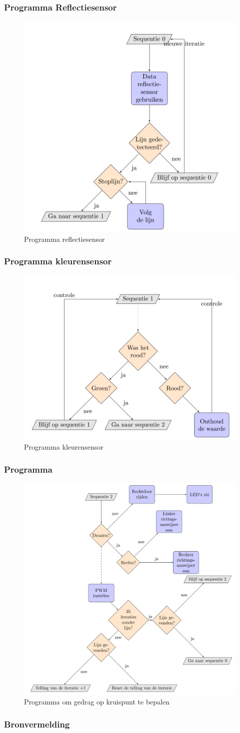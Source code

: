 \documentclass
   [kulak] %
   {kulakbeamer}
\begin{document}
\begin{frame}
	\frametitle{Programma Reflectiesensor}
	\begin{figure}
		\centering
		\includegraphics[width=.5\textwidth,]{flowchart_sequentie0}
		\caption{Programma reflectiesensor}
	\end{figure}
\end{frame}

\begin{frame}
	\frametitle{Programma kleurensensor}
	\begin{figure}
		\centering
		\includegraphics[width=.7\textwidth]{flowchart_sequentie1}
		\caption{Programma kleurensensor}
	\end{figure}
\end{frame}

\begin{frame}
	\frametitle{Programma}
	\begin{figure}
		\centering
		\includegraphics[width=.5\textwidth]{flowchart_grootProgramma}
		\caption{Programma om gedrag op kruispunt te bepalen}
	\end{figure}
\end{frame}

\begin{frame}
\frametitle{Bronvermelding}
	
	
	
\end{frame}
\end{document}

